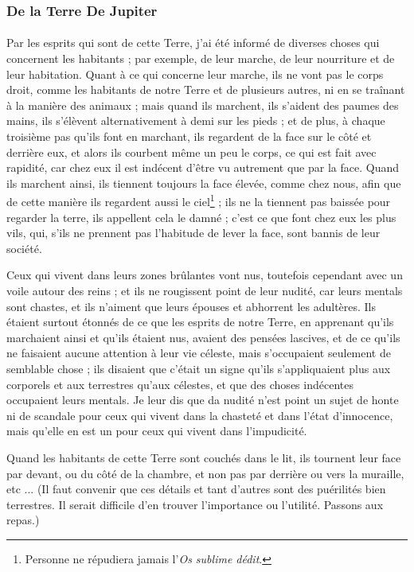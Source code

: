 \documentclass[a4paper, 11pt, oneside, landscape]{article}
\begin{document}
\subsubsection{De la Terre De Jupiter}
\paragraph{}
Par les esprits qui sont de cette Terre, j'ai été informé de diverses choses qui concernent les habitants ; par exemple, de leur marche, de leur nourriture et de leur habitation. Quant à ce qui concerne leur marche, ils ne vont pas le corps droit, comme les habitants de notre Terre et de plusieurs autres, ni en se traînant à la manière des animaux ; mais quand ils marchent, ils s'aident des paumes des mains, ils s'élèvent alternativement à demi sur les pieds ; et de plus, à chaque troisième pas qu'ils font en marchant, ils regardent de la face sur le côté et derrière eux, et alors ils courbent même un peu le corps, ce qui est fait avec rapidité, car chez eux il est indécent d'être vu autrement que par la face. Quand ils marchent ainsi, ils tiennent toujours la face élevée, comme chez nous, afin que de cette manière ils regardent aussi le ciel\footnote{Personne ne répudiera jamais l'\emph{Os sublime dédit}.} ; ils ne la tiennent pas baissée pour regarder la terre, ils appellent cela le damné ; c'est ce que font chez eux les plus vils, qui, s'ils ne prennent pas l'habitude de lever la face, sont bannis de leur société.

Ceux qui vivent dans leurs zones brûlantes vont nus, toutefois cependant avec un voile autour des reins ; et ils ne rougissent point de leur nudité, car leurs mentals sont chastes, et ils n'aiment que leurs épouses et abhorrent les adultères. Ils étaient surtout étonnés de ce que les esprits de notre Terre, en apprenant qu'ils marchaient ainsi et qu'ils étaient nus, avaient des pensées lascives, et de ce qu'ils ne faisaient aucune attention à leur vie céleste, mais s'occupaient seulement de semblable chose ; ils disaient que c'était un signe qu'ils s'appliquaient plus aux corporels et aux terrestres qu'aux célestes, et que des choses indécentes occupaient leurs mentals. Je leur dis que da nudité n'est point un sujet de honte ni de scandale pour ceux qui vivent dans la chasteté et dans l'état d'innocence, mais qu'elle en est un pour ceux qui vivent dans l'impudicité.

Quand les habitants de cette Terre sont couchés dans le lit, ils tournent leur face par devant, ou du côté de la chambre, et non pas par derrière ou vers la muraille, etc ... (Il faut convenir que ces détails et tant d'autres sont des puérilités bien terrestres. Il serait difficile d'en trouver l'importance ou l'utilité. Passons aux repas.)
\end{document}
